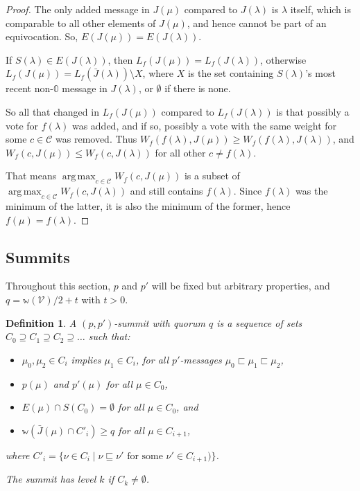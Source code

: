 \documentclass[12pt, fleqn]{article}
\newtheorem{definition}{Definition}
\newcommand{\ww}{\mathbb{w}}
\DeclareMathOperator*{\argmax}{arg\,max}
\begin{document}
\begin{proof}
  The only added message in $J(\mu)$ compared to $J(\lambda)$ is $\lambda$ itself, which is comparable to all other elements of $J(\mu)$, and hence cannot be part of an equivocation. So, $E(J(\mu)) = E(J(\lambda))$.

  If $S(\lambda) \in E(J(\lambda))$, then $L_f (J(\mu)) = L_f (J(\lambda))$, otherwise $L_f(J(\mu)) = L_f(\bar{J}(\lambda)) \setminus X$, where $X$ is the set containing $S(\lambda)$'s most recent non-$\mathbb{0}$ message in $J(\lambda)$, or $\emptyset$ if there is none.

  So all that changed in $L_f(J(\mu))$ compared to $L_f(J(\lambda))$ is that possibly a vote for $f(\lambda)$ was added, and if so, possibly a vote with the same weight for some $c\in \mathcal{C}$ was removed. Thus $W_f(f(\lambda), J(\mu)) \geq W_f(f(\lambda), J(\lambda))$, and $W_f(c, J(\mu)) \leq W_f(c, J(\lambda))$ for all other $c \neq f(\lambda)$.

  That means $\argmax_{c \in \mathcal{C}} W_f(c, J(\mu))$ is a subset of $\argmax_{c \in \mathcal{C}} W_f(c, J(\lambda))$ and still contains $f(\lambda)$. Since $f(\lambda)$ was the minimum of the latter, it is also the minimum of the former, hence $f(\mu) = f(\lambda)$.
\end{proof}


\subsection{Summits}

Throughout this section, $p$ and $p'$ will be fixed but arbitrary properties, and $q = \ww(\mathcal{V})/2 + t$ with $t > 0$.

\begin{definition}
A \emph{$(p, p')$-summit with quorum $q$} is a sequence of sets $C_0 \supseteq C_1 \supseteq C_2 \supseteq \ldots$ such that:
\begin{itemize}
  \item $\mu_0, \mu_2 \in C_i$ implies $\mu_1 \in C_i$, for all $p'$-messages $\mu_0 \sqsubset \mu_1 \sqsubset \mu_2$,
  \item $p(\mu)$ and $p'(\mu)$ for all $\mu \in C_0$,
  \item $E(\mu) \cap S(C_0) = \emptyset$ for all $\mu \in C_0$, and
  \item $\ww(\bar{J}(\mu) \cap C'_i ) \geq q$ for all $\mu \in C_{i + 1}$,
\end{itemize}
where $C'_i = \{\nu \in C_i \mid \nu \sqsubseteq \nu' \text{ for some } \nu' \in C_{i + 1})\}$.

The summit \emph{has level $k$} if $C_k \neq \emptyset$.
\end{definition}
\end{document}
